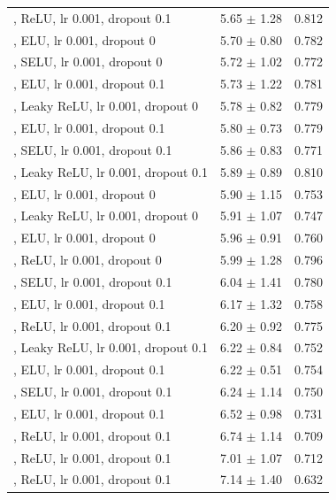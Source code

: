 \documentclass[journal,article,submit,pdftex,moreauthors]{Definitions/mdpi}
\begin{document}
\begin{center}
\begin{longtable}{@{}p{8.2cm} c c@{}}
\quad [128, 64, 32], ReLU, lr 0.001, dropout 0.1 & 5.65 $\pm$ 1.28 & 0.812 \\
\quad [64, 32, 16], ELU, lr 0.001, dropout 0 & 5.70 $\pm$ 0.80 & 0.782 \\
\quad [64, 32, 16, 8], SELU, lr 0.001, dropout 0 & 5.72 $\pm$ 1.02 & 0.772 \\
\quad [128, 64, 32], ELU, lr 0.001, dropout 0.1 & 5.73 $\pm$ 1.22 & 0.781 \\
\quad [32, 16, 8], Leaky ReLU, lr 0.001, dropout 0 & 5.78 $\pm$ 0.82 & 0.779 \\
\quad [64, 32, 16], ELU, lr 0.001, dropout 0.1 & 5.80 $\pm$ 0.73 & 0.779 \\
\quad [64, 32, 16, 8], SELU, lr 0.001, dropout 0.1 & 5.86 $\pm$ 0.83 & 0.771 \\
\quad [128, 64, 32], Leaky ReLU, lr 0.001, dropout 0.1 & 5.89 $\pm$ 0.89 & 0.810 \\
\quad [32, 16, 8], ELU, lr 0.001, dropout 0 & 5.90 $\pm$ 1.15 & 0.753 \\
\quad [64, 32, 16, 8], Leaky ReLU, lr 0.001, dropout 0 & 5.91 $\pm$ 1.07 & 0.747 \\
\quad [64, 32, 16, 8], ELU, lr 0.001, dropout 0 & 5.96 $\pm$ 0.91 & 0.760 \\
\quad [32, 16, 8], ReLU, lr 0.001, dropout 0 & 5.99 $\pm$ 1.28 & 0.796 \\
\quad [128, 64, 32, 16, 8], SELU, lr 0.001, dropout 0.1 & 6.04 $\pm$ 1.41 & 0.780 \\
\quad [128, 64, 32, 16, 8], ELU, lr 0.001, dropout 0.1 & 6.17 $\pm$ 1.32 & 0.758 \\
\quad [128, 64, 32, 16, 8], ReLU, lr 0.001, dropout 0.1 & 6.20 $\pm$ 0.92 & 0.775 \\
\quad [32, 16, 8], Leaky ReLU, lr 0.001, dropout 0.1 & 6.22 $\pm$ 0.84 & 0.752 \\
\quad [64, 32, 16, 8], ELU, lr 0.001, dropout 0.1 & 6.22 $\pm$ 0.51 & 0.754 \\
\quad [32, 16, 8], SELU, lr 0.001, dropout 0.1 & 6.24 $\pm$ 1.14 & 0.750 \\
\quad [32, 16, 8], ELU, lr 0.001, dropout 0.1 & 6.52 $\pm$ 0.98 & 0.731 \\
\quad [32, 16, 8], ReLU, lr 0.001, dropout 0.1 & 6.74 $\pm$ 1.14 & 0.709 \\
\quad [64, 32, 16], ReLU, lr 0.001, dropout 0.1 & 7.01 $\pm$ 1.07 & 0.712 \\
\quad [64, 32, 16, 8], ReLU, lr 0.001, dropout 0.1 & 7.14 $\pm$ 1.40 & 0.632 \\

\end{longtable}
\end{center}
\end{document}
